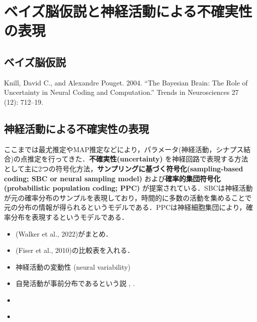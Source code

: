 \section{ベイズ脳仮説と神経活動による不確実性の表現}

\subsection{ベイズ脳仮説}
Knill, David C., and Alexandre Pouget. 2004. “The Bayesian Brain: The Role of Uncertainty in Neural Coding and Computation.” Trends in Neurosciences 27 (12): 712–19.

\subsection{神経活動による不確実性の表現}
ここまでは最尤推定やMAP推定などにより，パラメータ(神経活動，シナプス結合)の点推定を行ってきた．\textbf{不確実性(uncertainty)} を神経回路で表現する方法として主に2つの符号化方法，\textbf{サンプリングに基づく符号化(sampling-based coding; SBC or neural sampling model)} および\textbf{確率的集団符号化(probabilistic population coding; PPC)} が提案されている．SBCは神経活動が元の確率分布のサンプルを表現しており，時間的に多数の活動を集めることで元の分布の情報が得られるというモデルである．PPCは神経細胞集団により，確率分布を表現するというモデルである．

\begin{itemize}
\item (Walker et al., 2022)がまとめ．
\item (Fiser et al., 2010)の比較表を入れる．
\item 神経活動の変動性 (neural variability)
\item 自発活動が事前分布であるという説 \citep{Fiser2010-kw}, \citep{Berkes2011-it}.
\item \citep{Hoyer2002-ci}
\item \citep{Sanborn2016-en}
\end{itemize}





